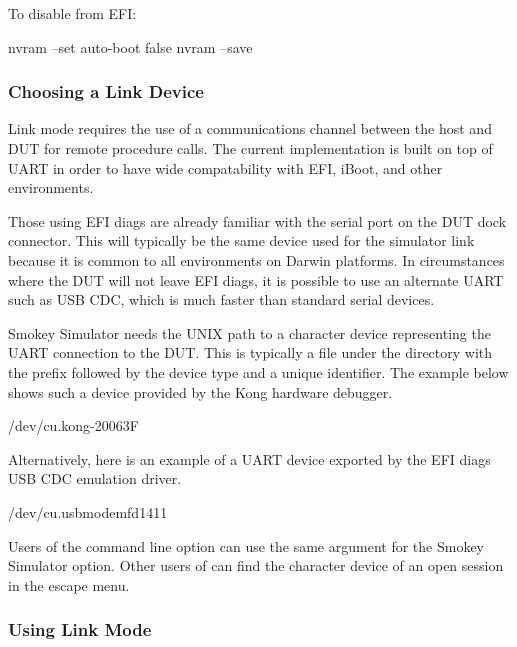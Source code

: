 To disable  from EFI:

\begin{CommandLine}
nvram --set auto-boot false
nvram --save
\end{CommandLine}

\subsubsection{Choosing a Link Device}

Link mode requires the use of a communications channel between the host and DUT
for remote procedure calls.  The current implementation is built on top of UART
in order to have wide compatability with EFI, iBoot, and other environments.

Those using EFI diags are already familiar with the serial port on the DUT dock
connector.  This will typically be the same device used for the simulator link
because it is common to all environments on Darwin platforms.  In circumstances
where the DUT will not leave EFI diags, it is possible to use an alternate UART
such as USB CDC, which is much faster than standard serial devices.

Smokey Simulator needs the UNIX path to a character device representing the
UART connection to the DUT.  This is typically a file under the 
directory with the prefix  followed by the device type and a
unique identifier.  The example below shows such a device provided by the Kong
hardware debugger.

\begin{Setting}
/dev/cu.kong-20063F
\end{Setting}

Alternatively, here is an example of a UART device exported by the EFI diags
USB CDC emulation driver.

\begin{Setting}
/dev/cu.usbmodemfd1411
\end{Setting}

Users of the  command line option  can use the
same argument for the Smokey Simulator  option.  Other users of
 can find the character device of an open session in the
escape menu.

\subsubsection{Using Link Mode}

